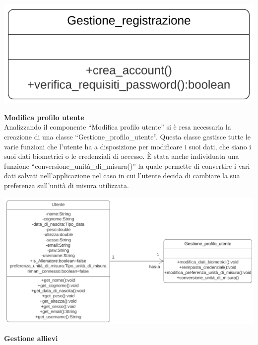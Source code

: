 \documentclass{article}
\begin{document}
      \begin{center}
            \includegraphics[scale=0.5]{classi/Gestione_registrazione.png}
      \end{center}

      {\large\textbf{Modifica profilo utente}}\\

      Analizzando il componente “Modifica profilo utente” si è resa necessaria la creazione di una classe “Gestione\_profilo\_utente”. Questa classe gestisce tutte le varie funzioni che l’utente ha a disposizione per modificare i suoi dati, che siano i suoi dati biometrici o le credenziali di accesso. È stata anche individuata una funzione “conversione\_unità\_di\_misura()” la quale permette di convertire i vari dati salvati nell’applicazione nel caso in cui l’utente decida di cambiare la sua preferenza sull’unità di misura utilizzata.\\

      \begin{center}
            \includegraphics[scale=0.5]{classi/Gestione_profilo_utente.png}
      \end{center}

      {\large\textbf{Gestione allievi}}\\
\end{document}
